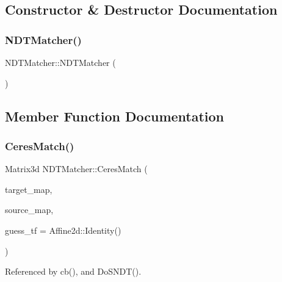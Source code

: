 \subsection{Constructor \& Destructor Documentation}
\mbox{\label{classNDTMatcher_aa66b5b0cf92b94ef3163c976b0548d76}} 
\subsubsection{\texorpdfstring{N\+D\+T\+Matcher()}{NDTMatcher()}}
{\footnotesize\ttfamily N\+D\+T\+Matcher\+::\+N\+D\+T\+Matcher (\begin{DoxyParamCaption}{ }\end{DoxyParamCaption})}



\subsection{Member Function Documentation}
\mbox{\label{classNDTMatcher_a42e715331fbb1cb5fc7489cea741b6df}} 
\subsubsection{\texorpdfstring{Ceres\+Match()}{CeresMatch()}\hspace{0.1cm}{\footnotesize\ttfamily [1/2]}}
{\footnotesize\ttfamily Matrix3d N\+D\+T\+Matcher\+::\+Ceres\+Match (\begin{DoxyParamCaption}\item[{\hyperlink{classNDTMap}{N\+D\+T\+Map} \&}]{target\+\_\+map,  }\item[{\hyperlink{classNDTMap}{N\+D\+T\+Map} \&}]{source\+\_\+map,  }\item[{const Affine2d \&}]{guess\+\_\+tf = {\ttfamily Affine2d\+:\+:Identity()} }\end{DoxyParamCaption})\hspace{0.3cm}{\ttfamily [inline]}}



Referenced by cb(), and Do\+S\+N\+D\+T().

\mbox{\label{classNDTMatcher_ac55488eff673a57c3d7f3ab6a59c99a1}} 
